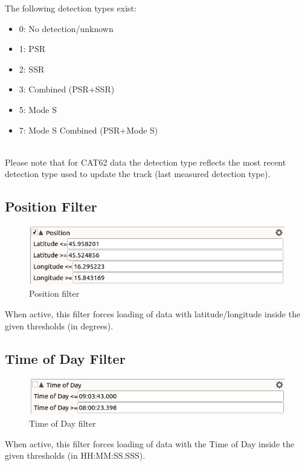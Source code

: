 The following detection types exist:
\begin{itemize}
 \item 0: No detection/unknown
 \item 1: PSR
 \item 2: SSR
 \item 3: Combined (PSR+SSR)
 \item 5: Mode S
 \item 7: Mode S Combined (PSR+Mode S)
\end{itemize}
\  \\

Please note that for CAT62 data the detection type reflects the most recent detection type used to update the track (last measured detection type).

\subsection{Position Filter}

\begin{figure}[H]
  \center
    \includegraphics[width=12cm,frame]{figures/filter_position.png}
  \caption{Position filter}
\end{figure}

When active, this filter forces loading of data with latitude/longitude inside the given thresholds (in degrees).

\subsection{Time of Day Filter}

\begin{figure}[H]
  \center
    \includegraphics[width=12cm,frame]{figures/filter_tod.png}
  \caption{Time of Day filter}
\end{figure}

When active, this filter forces loading of data with the Time of Day inside the given thresholds (in HH:MM:SS.SSS).

